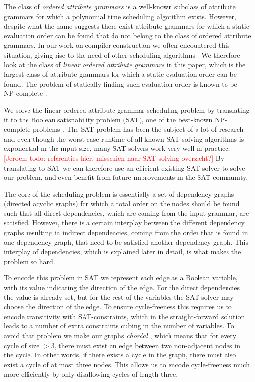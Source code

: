 \documentclass{llncs}
\newif\iffinal\finalfalse
\newcommand{\REM}[3]{\iffinal\else\textcolor{#2}{[#1: #3]}\fi}
\newcommand{\Jeroen}[1]{\REM{Jeroen}{red}{#1}}
\begin{document}
The class of \emph{ordered attribute grammars} \cite{kastens80} is a well-known subclass of attribute grammars for which a polynomial time scheduling algorithm exists. However, despite what the name suggests there exist attribute grammars for which a static evaluation order can be found that do not belong to the class of ordered attribute grammars. In our work on compiler construction we often encountered this situation, giving rise to the need of other scheduling algorithms \cite{bransen2012}. We therefore look at the class of \emph{linear ordered attribute grammars} in this paper, which is the largest class of attribute grammars for which a static evaluation order can be found. The problem of statically finding such evaluation order is known to be NP-complete \cite{engelfriet82}.

We solve the linear ordered attribute grammar scheduling problem by translating it to the Boolean satisfiability problem (SAT), one of the best-known NP-complete problems \cite{Cook:1971}. The SAT problem has been the subject of a lot of research and even though the worst case runtime of all known SAT-solving algorithms is exponential in the input size, many SAT-solvers work very well in practice. \Jeroen{todo: referenties hier, misschien naar SAT-solving overzicht?} By translating to SAT we can therefore use an efficient existing SAT-solver to solve our problem, and even benefit from future improvements in the SAT-community.

The core of the scheduling problem is essentially a set of dependency graphs (directed acyclic graphs) for which a total order on the nodes should be found such that all direct dependencies, which are coming from the input grammar, are satisfied. However, there is a certain interplay between the different dependency graphs resulting in indirect dependencies, coming from the order that is found in one dependency graph, that need to be satisfied another dependency graph. This interplay of dependencies, which is explained later in detail, is what makes the problem so hard.

To encode this problem in SAT we represent each edge as a Boolean variable, with its value indicating the direction of the edge. For the direct dependencies the value is already set, but for the rest of the variables the SAT-solver may choose the direction of the edge. To ensure cycle-freeness this requires us to encode transitivity with SAT-constraints, which in the straight-forward solution leads to a number of extra constraints cubing in the number of variables. To avoid that problem we make our graphs \emph{chordal} \cite{Dirac:1961}, which means that for every cycle of size $> 3$, there must exist an edge between two non-adjacent nodes in the cycle. In other words, if there exists a cycle in the graph, there must also exist a cycle of at most three nodes. This allows us to encode cycle-freeness much more efficiently by only disallowing cycles of length three.
\end{document}
